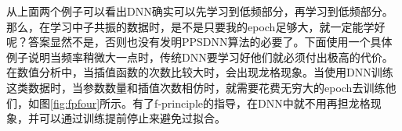 从上面两个例子可以看出DNN确实可以先学习到低频部分，再学习到低频部分。那么，在学习中子共振的数据时，是不是只要我的epoch足够大，就一定能学好呢？答案显然不是，否则也没有发明PPSDNN算法的必要了。下面使用一个具体例子说明当频率稍微大一点时，传统DNN要学习好他们就必须付出极高的代价。在数值分析中，当插值函数的次数比较大时，会出现龙格现象。当使用DNN训练这类数据时，当参数数量和插值次数相仿时，就需要花费无穷大的epoch去训练他们，如图\ref{fig:fpfour}所示。有了f-principle的指导，在DNN中就不用再担龙格现象，并可以通过训练提前停止来避免过拟合。
\begin{figure}[htbp!]
    \centering

\end{figure}
